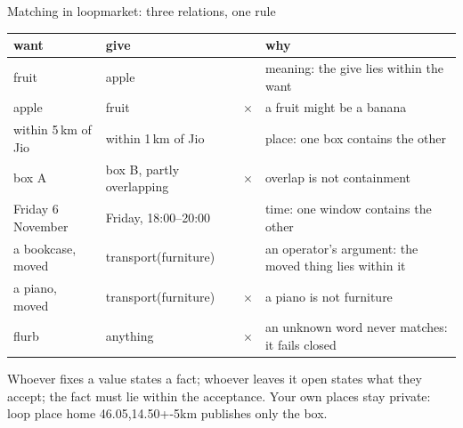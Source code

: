 \documentclass[aspectratio=169,11pt]{beamer}
\newcommand{\tick}{\textcolor{accent}{\checkmark}}
\newcommand{\cross}{\textcolor{warn}{$\times$}}
\newcommand{\code}[1]{{\ttfamily #1}}
\begin{document}
{\begin{frame}{Matching in loopmarket: three relations, one rule}
  \vspace{-1mm}
  \footnotesize
  \renewcommand{\arraystretch}{1.08}
  \begin{tabular}{@{}>{\raggedright\arraybackslash}p{33mm}>{\raggedright\arraybackslash}p{37mm}c>{\raggedright\arraybackslash}p{54mm}@{}}
    \toprule
    \textbf{want} & \textbf{give} & & \textbf{why} \\
    \midrule
    fruit & apple & \tick & meaning: the give lies within the want \\
    apple & fruit & \cross & a fruit might be a banana \\
    within 5\,km of Jio & within 1\,km of Jio & \tick & place: one box contains the other \\
    box A & box B, partly overlapping & \cross & overlap is not containment \\
    Friday 6 November & Friday, 18:00--20:00 & \tick & time: one window contains the other \\
    a bookcase, moved & \code{transport(furniture)} & \tick & an operator's argument: the moved thing lies within it \\
    a piano, moved & \code{transport(furniture)} & \cross & a piano is not furniture \\
    flurb & anything & \cross & an unknown word never matches: it fails closed \\
    \bottomrule
  \end{tabular}
  \vspace{3mm}

  {\small Whoever fixes a value states a fact; whoever leaves it open states what they accept; the fact must lie within the acceptance. Your own places stay private: \code{loop place home 46.05,14.50+-5km} publishes only the box.\par}
\end{frame}

}
\end{document}
